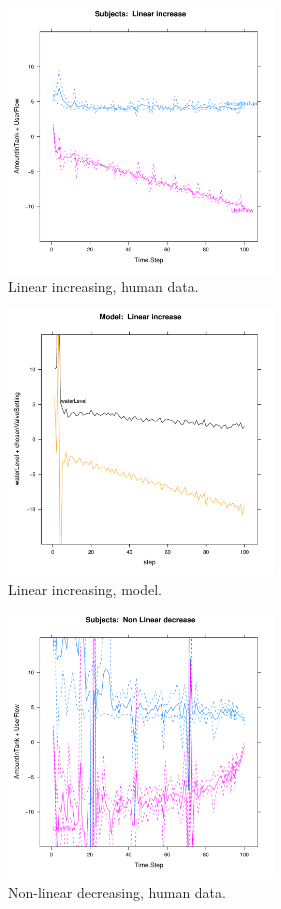 \documentclass[twocolumn]{article}
\begin{document}
\begin{figure}[p]
\includegraphics[width=7cm]{li_human.pdf}
\caption{Linear increasing, human data.}
\label{li.human}
\end{figure}
\begin{figure}[p]
\includegraphics[width=7cm]{li_model.pdf}
\caption{Linear increasing, model.}
\label{li.model}
\end{figure}
\begin{figure}[p]
\includegraphics[width=7cm]{nd_human.pdf}
\caption{Non-linear decreasing, human data.}
\label{nd.human}
\end{figure}
\end{document}
